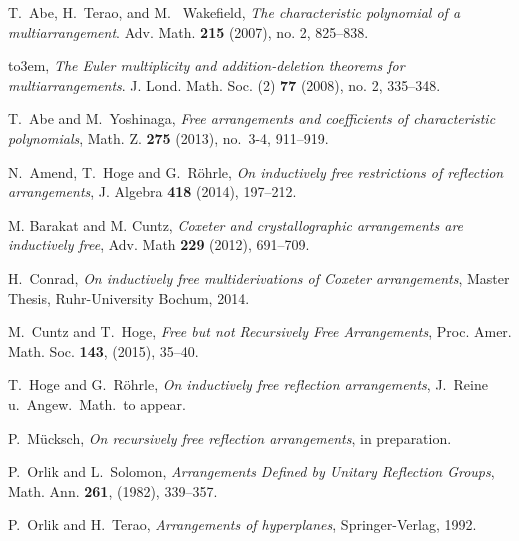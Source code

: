 \bigskip



\providecommand{\bysame}{\leavevmode\hbox to3em{\hrulefill}\thinspace}
\providecommand{\MR}{\relax\ifhmode\unskip\space\fi MR }
\providecommand{\MRhref}[2]{  \href{http://www.ams.org/mathscinet-getitem?mr=#1}{#2} }
\providecommand{\href}[2]{#2}
\begin{thebibliography}{ATW07}

T.~Abe, H.~Terao, and M.~ Wakefield, 
\emph{The characteristic polynomial of a multiarrangement}. 
Adv. Math. \textbf{215} (2007), no. 2, 825--838. 

\bysame, 
\emph{The Euler multiplicity and addition-deletion theorems for multiarrangements}. 
J. Lond. Math. Soc. (2)  \textbf{77} (2008), no. 2, 335--348.

T.~Abe and M.~Yoshinaga, 
\emph{Free arrangements and coefficients of characteristic polynomials}, 
Math. Z. \textbf{275} (2013), no.~3-4, 911--919.

N.~Amend, T.~Hoge and G.~R\"ohrle, 
\emph{On inductively free restrictions of reflection arrangements},
 J. Algebra \textbf{418} (2014), 197--212.

M. Barakat and M. Cuntz, \emph{Coxeter and 
    crystallographic arrangements are inductively free}, Adv. Math \textbf{229}
    (2012), 691--709.

H.~Conrad, 
\emph{On inductively free multiderivations of Coxeter arrangements},
Master Thesis, Ruhr-University Bochum, 2014.

 M.~Cuntz and  T.~Hoge,
\emph{Free but not Recursively Free Arrangements},
Proc. Amer. Math. Soc. \textbf{143}, (2015), 35--40.

T.~Hoge and G.~R\"ohrle, 
\emph{On inductively free reflection arrangements}, 
J.~Reine u.~Angew.~Math.~to appear.

P.~M\"ucksch,
\emph{On recursively free reflection arrangements},
in preparation.

P.~Orlik and L.~Solomon,
\emph{Arrangements Defined by Unitary Reflection Groups},
Math. Ann. \textbf{261}, (1982), 339--357.

 P.~Orlik and H.~Terao,
  \emph{Arrangements of hyperplanes}, Springer-Verlag, 1992.


\end{thebibliography}
